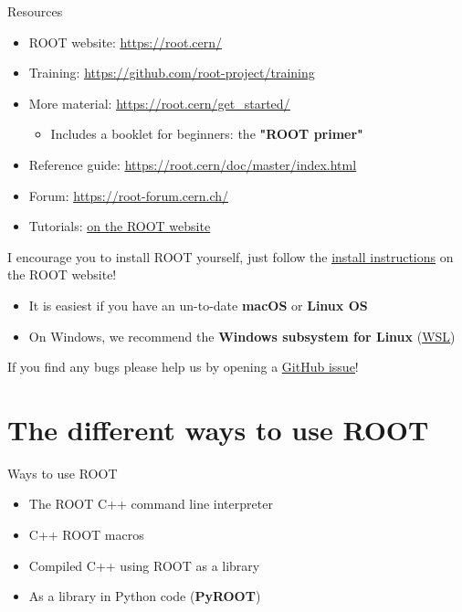 \documentclass[aspectratio=169]{beamer}
\newcommand{\myhref}[2]{{\color{blue}\href{#1}{\underline{#2}}}}
\begin{document}
\begin{frame}{Resources}
\begin{itemize}
    \item ROOT website: \myhref{https://root.cern/}{https://root.cern/}
    \item Training: \myhref{https://github.com/root-project/training}{https://github.com/root-project/training}
    \item More material: \myhref{https://root.cern/get_started/}{https://root.cern/get\_started/}
    \begin{itemize}
        \item Includes a booklet for beginners: the \textbf{"ROOT primer"}
    \end{itemize}
    \item Reference guide: \myhref{https://root.cern/doc/master/index.html}{https://root.cern/doc/master/index.html}
    \item Forum: \myhref{https://root-forum.cern.ch/}{https://root-forum.cern.ch/}
    \item Tutorials: \myhref{https://root.cern/doc/master/group__Tutorials.html}{on the ROOT website}
\end{itemize}
    \vspace{3mm}
I encourage you to install ROOT yourself, just follow the \myhref{https://root.cern/install/}{install instructions} on the ROOT website!
    \begin{itemize}
        \item It is easiest if you have an un-to-date \textbf{macOS} or \textbf{Linux OS}
        \item On Windows, we recommend the \textbf{Windows subsystem for Linux} (\myhref{https://docs.microsoft.com/en-us/windows/wsl/about}{WSL})
    \end{itemize}
    \vspace{3mm}
    If you find any bugs please help us by opening a \myhref{https://github.com/root-project/root/issues}{GitHub issue}!
\end{frame}

\section{The different ways to use ROOT}

\begin{frame}{Ways to use ROOT}
\begin{itemize}
    \item The ROOT C++ command line interpreter
    \item C++ ROOT macros
    \item Compiled C++ using ROOT as a library
    \item As a library in Python code (\textbf{PyROOT})
\end{itemize}
\end{frame}
\end{document}
